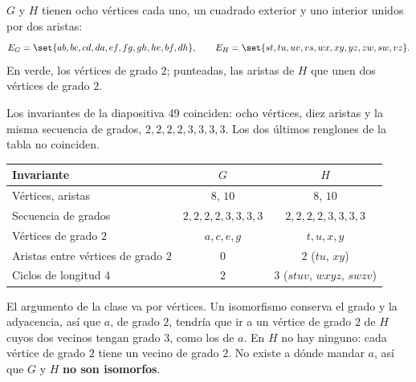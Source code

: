 \documentclass[11pt,letterpaper]{article}
\begin{document}
\begin{ejemplo}
  \label{ej:isomorfismo-teoria}
  $G$ y $H$ tienen ocho vértices cada uno, un cuadrado exterior y uno
  interior unidos por dos aristas:
  \[
    E_G = \set{ab, bc, cd, da, ef, fg, gh, he, bf, dh} , \qquad
    E_H = \set{st, tu, uv, vs, wx, xy, yz, zw, sw, vz} .
  \]
  En verde, los vértices de grado $2$; punteadas, las aristas de $H$
  que unen dos vértices de grado $2$.
  \begin{center}
  \end{center}
  Los invariantes de la diapositiva 49 coinciden: ocho vértices, diez
  aristas y la misma secuencia de grados, $2, 2, 2, 2, 3, 3, 3, 3$. Los
  dos últimos renglones de la tabla no coinciden.
  \begin{center}
  \small
  \begin{tabular}{lcc}
    \toprule
    \textbf{Invariante} & $G$ & $H$ \\
    \midrule
    Vértices, aristas & $8$, $10$ & $8$, $10$ \\
    Secuencia de grados & $2,2,2,2,3,3,3,3$ & $2,2,2,2,3,3,3,3$ \\
    Vértices de grado $2$ & $a, c, e, g$ & $t, u, x, y$ \\
    Aristas entre vértices de grado $2$ & $0$ & $2$ ($tu$, $xy$) \\
    Ciclos de longitud $4$ & $2$ & $3$ ($stuv$, $wxyz$, $swzv$) \\
    \bottomrule
  \end{tabular}
  \end{center}
  El argumento de la clase va por vértices. Un isomorfismo conserva el
  grado y la adyacencia, así que $a$, de grado $2$, tendría que ir a un
  vértice de grado $2$ de $H$ cuyos dos vecinos tengan grado $3$, como
  los de $a$. En $H$ no hay ninguno: cada vértice de grado $2$ tiene un
  vecino de grado $2$. No existe a dónde mandar $a$, así que $G$ y $H$
  \textbf{no son isomorfos}.
\end{ejemplo}
\end{document}

